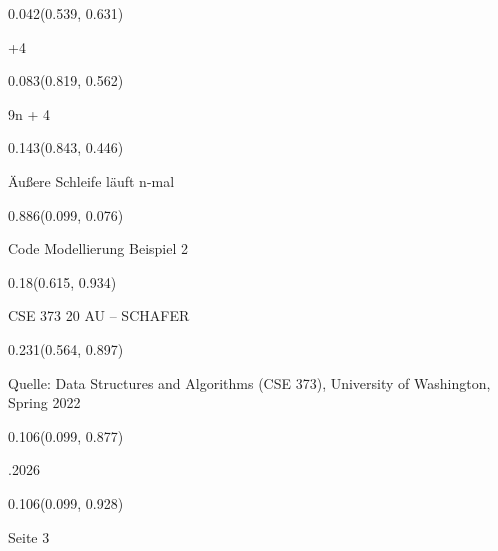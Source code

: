 \documentclass[aspectratio=169]{beamer}
\begin{document}
\begin{frame}[fragile]
\begin{textblock}{0.042}(0.539, 0.631)
  \begin{minipage}[t][0.044\paperheight]{\linewidth}
    +4
  \end{minipage}
\end{textblock}

\begin{textblock}{0.083}(0.819, 0.562)
  \begin{minipage}[t][0.044\paperheight]{\linewidth}
    9n + 4
  \end{minipage}
\end{textblock}

\begin{textblock}{0.143}(0.843, 0.446)
  \begin{minipage}[t][0.094\paperheight]{\linewidth}
    Äußere Schleife läuft n-mal
  \end{minipage}
\end{textblock}

\begin{textblock}{0.886}(0.099, 0.076)
  \begin{minipage}[t][0.131\paperheight]{\linewidth}
    Code Modellierung  Beispiel 2
  \end{minipage}
\end{textblock}

\begin{textblock}{0.18}(0.615, 0.934)
  \begin{minipage}[b][0.032\paperheight]{\linewidth}
    \raggedright
    {\fontsize{3}{3.3}\selectfont CSE 373 20 AU – SCHAFER}
  \end{minipage}
\end{textblock}

\begin{textblock}{0.231}(0.564, 0.897)
  \begin{minipage}[b][0.032\paperheight]{\linewidth}
    \raggedright
    {\fontsize{3}{3.3}\selectfont Quelle: Data Structures and Algorithms (CSE 373), University of Washington, Spring 2022}
  \end{minipage}
\end{textblock}

\begin{textblock}{0.106}(0.099, 0.877)
  \begin{minipage}[b][0.026\paperheight]{\linewidth}
    \raggedright
    {\fontsize{3}{3.3}.2026}
  \end{minipage}
\end{textblock}

\begin{textblock}{0.106}(0.099, 0.928)
  \begin{minipage}[b][0.031\paperheight]{\linewidth}
    \raggedright
    {\fontsize{3}{3.3}\selectfont Seite 3}
  \end{minipage}
\end{textblock}
\end{frame}
\end{document}
